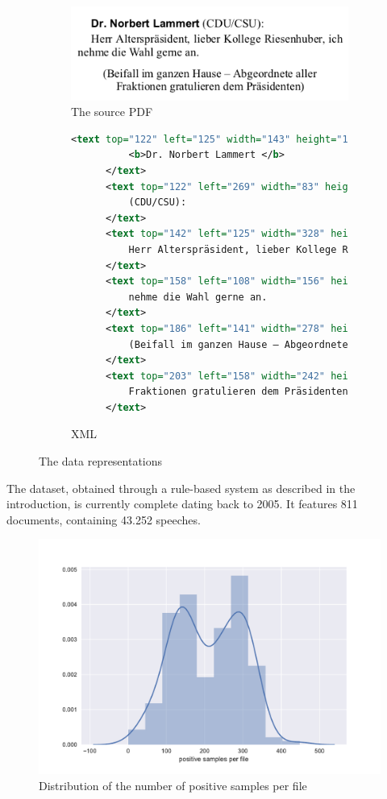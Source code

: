 \begin{figure}[htbp]
  \centering
  \begin{subfigure}[b]{0.6\textwidth} 
    \centering
    \includegraphics[width=\textwidth]{figures/source.png}
    \caption{The source PDF}
  \end{subfigure}
  \vspace{0.10\textwidth}
  \begin{subfigure}[b]{\textwidth}
	\centering
    \begin{lstlisting}[language=xml, morekeywords={text}]
      <text top="122" left="125" width="143" height="16" font="3">
          <b>Dr. Norbert Lammert </b>
      </text>
      <text top="122" left="269" width="83" height="17" font="4">
          (CDU/CSU):
      </text>
      <text top="142" left="125" width="328" height="17" font="4">
          Herr Alterspräsident, lieber Kollege Riesenhuber, ich
      </text>
      <text top="158" left="108" width="156" height="17" font="4">
          nehme die Wahl gerne an.
      </text>
      <text top="186" left="141" width="278" height="17" font="4">
          (Beifall im ganzen Hause – Abgeordnete aller
      </text>
      <text top="203" left="158" width="242" height="17" font="4">
          Fraktionen gratulieren dem Präsidenten)
      </text>
    \end{lstlisting}
    \caption{XML}
  \end{subfigure}
  \caption{The data representations}
  \label{fig:example}
\end{figure}

The dataset, obtained through a rule-based system as described in the
introduction, is currently complete dating back to 2005. It features 811
documents, containing 43.252 speeches.

\begin{figure}[htbp]
  \centering
  \includegraphics[width=\textwidth]{figures/distribution.pdf}
  \caption{Distribution of the number of positive samples per file}
  \label{fig:data_dist}
\end{figure}

